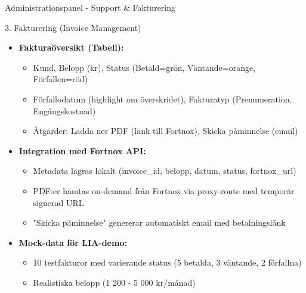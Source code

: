 \documentclass[10pt]{beamer}
\begin{document}
\begin{frame}{Administrationspanel - Support \& Fakturering}
\begin{block}{3. Fakturering (Invoice Management)}
  \begin{itemize}
    \item \textbf{Fakturaöversikt (Tabell):}
      \begin{itemize}
        \item Kund, Belopp (kr), Status (Betald=grön, Väntande=orange, Förfallen=röd)
        \item Förfallodatum (highlight om överskridet), Fakturatyp (Prenumeration, Engångskostnad)
        \item Åtgärder: Ladda ner PDF (länk till Fortnox), Skicka påminnelse (email)
      \end{itemize}
    \item \textbf{Integration med Fortnox API:}
      \begin{itemize}
        \item Metadata lagras lokalt (invoice\_id, belopp, datum, status, fortnox\_url)
        \item PDF:er hämtas on-demand från Fortnox via proxy-route med temporär signerad URL
        \item "Skicka påminnelse" genererar automatiskt email med betalningslänk
      \end{itemize}
    \item \textbf{Mock-data för LIA-demo:}
      \begin{itemize}
        \item 10 testfakturor med varierande status (5 betalda, 3 väntande, 2 förfallna)
        \item Realistiska belopp (1 200 - 5 000 kr/månad)
      \end{itemize}
  \end{itemize}
\end{block}

\end{frame}

\end{document}
